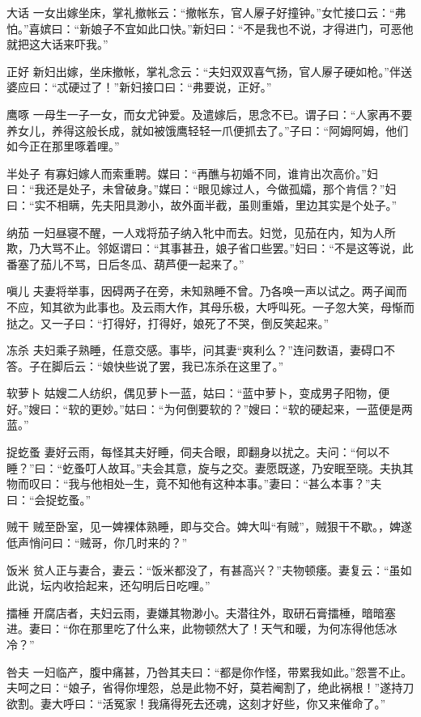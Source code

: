 \documentclass[12pt,UTF8]{ctexbook}
\begin{document}
大话
一女出嫁坐床，掌礼撤帐云：“撤帐东，官人屪子好撞钟。”女忙接口云：“弗怕。”喜嫔曰：“新娘子不宜如此口快。”新妇曰：“不是我也不说，才得进门，可恶他就把这大话来吓我。”

正好
新妇出嫁，坐床撤帐，掌礼念云：“夫妇双双喜气扬，官人屪子硬如枪。”伴送婆应曰：“忒硬过了！”新妇接口曰：“弗要说，正好。”

鹰啄
一母生一子一女，而女尤钟爱。及遣嫁后，思念不已。谓子曰：“人家再不要养女儿，养得这般长成，就如被饿鹰轻轻一爪便抓去了。”子曰：“阿姆阿姆，他们如今正在那里啄着哩。”

半处子
有寡妇嫁人而索重聘。媒曰：“再醮与初婚不同，谁肯出次高价。”妇曰：“我还是处子，未曾破身。”媒曰：“眼见嫁过人，今做孤孀，那个肯信？”妇曰：“实不相瞒，先夫阳具渺小，故外面半截，虽则重婚，里边其实是个处子。”

纳茄
一妇昼寝不醒，一人戏将茄子纳入牝中而去。妇觉，见茄在内，知为人所欺，乃大骂不止。邻妪谓曰：“其事甚丑，娘子省口些罢。”妇曰：“不是这等说，此番塞了茄儿不骂，日后冬瓜、葫芦便一起来了。”

嗔儿
夫妻将举事，因碍两子在旁，未知熟睡不曾。乃各唤一声以试之。两子闻而不应，知其欲为此事也。及云雨大作，其母乐极，大呼叫死。一子忽大笑，母惭而挞之。又一子曰：“打得好，打得好，娘死了不哭，倒反笑起来。”

冻杀
夫妇乘子熟睡，任意交感。事毕，问其妻“爽利么？”连问数语，妻碍口不答。子在脚后云：“娘快些说了罢，我已冻杀在这里了。”

软萝卜
姑嫂二人纺织，偶见萝卜一蓝，姑曰：“蓝中萝卜，变成男子阳物，便好。”嫂曰：“软的更妙。”姑曰：“为何倒要软的？”嫂曰：“软的硬起来，一蓝便是两蓝。”

捉虼蚤
妻好云雨，每怪其夫好睡，伺夫合眼，即翻身以扰之。夫问：“何以不睡？”曰：“虼蚤叮人故耳。”夫会其意，旋与之交。妻愿既遂，乃安眠至晓。夫执其物而叹曰：“我与他相处─生，竟不知他有这种本事。”妻曰：“甚么本事？”夫曰：“会捉虼蚤。”

贼干
贼至卧室，见一婢裸体熟睡，即与交合。婢大叫“有贼”，贼狠干不歇。，婢遂低声悄问曰：“贼哥，你几时来的？”

饭米
贫人正与妻合，妻云：“饭米都没了，有甚高兴？”夫物顿痿。妻复云：“虽如此说，坛内收拾起来，还勾明后日吃哩。”

擂棰
开腐店者，夫妇云雨，妻嫌其物渺小。夫潜往外，取研石膏擂棰，暗暗塞进。妻曰：“你在那里吃了什么来，此物顿然大了！天气和暖，为何冻得他恁冰冷？”

咎夫
一妇临产，腹中痛甚，乃咎其夫曰：“都是你作怪，带累我如此。”怨詈不止。夫呵之曰：“娘子，省得你埋怨，总是此物不好，莫若阉割了，绝此祸根！”遂持刀欲割。妻大呼曰：“活冤家！我痛得死去还魂，这刻才好些，你又来催命了。”
\end{document}

